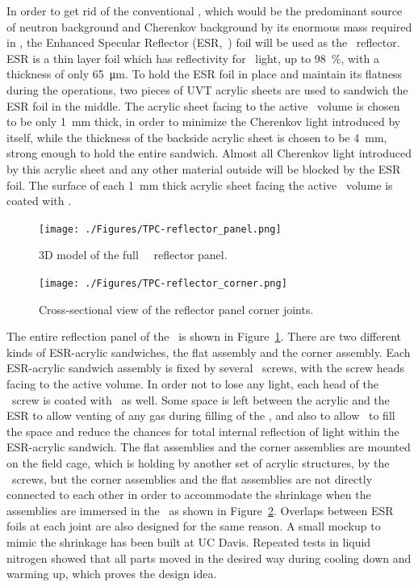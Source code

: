 In order to get rid of the conventional \PTFE, which would be the predominant source of neutron background and Cherenkov background by its enormous mass required in \DSk, the Enhanced Specular Reflector (ESR,~\cite{ESR}) foil will be used as the \TPC\ reflector. ESR is a thin layer foil which has reflectivity for \DSfPMTWaveLength\ light, up to \SI{98}{\percent}, with a thickness of only \SI{65}{\micro\meter}.  To hold the ESR foil in place and maintain its flatness during the operations, two pieces of UVT acrylic sheets are used to sandwich the ESR foil in the middle. The acrylic sheet facing to the active \LAr\ volume is chosen to be only \SI{1}{\mm} thick, in order to minimize the Cherenkov light introduced by itself, while the thickness of the backside acrylic sheet is chosen to be \SI{4}{\mm}, strong enough to hold the entire sandwich. Almost all Cherenkov light introduced by this acrylic sheet and any other material outside will be blocked by the ESR foil. The surface of each \SI{1}{\mm} thick acrylic sheet facing the active \LAr\ volume is coated with \TPB.

\begin{figure}[h!]
\centering
\texttt{[image: ./Figures/TPC-reflector\_panel.png]}
\caption{3D model of the full \DSk\ \LArTPC\ reflector panel.}
\label{fig:re_panel}
\end{figure}

\begin{figure}[h!]
\centering
\texttt{[image: ./Figures/TPC-reflector\_corner.png]}
\caption{Cross-sectional view of the reflector panel corner joints.}
\label{fig:re_corner}
\end{figure}

The entire reflection panel of the \TPC\ is shown in Figure~\ref{fig:re_panel}. There are two different kinds of ESR-acrylic sandwiches, the flat assembly and the corner assembly. Each ESR-acrylic sandwich assembly is fixed by several \PTFE\ screws, with the screw heads facing to the active volume. In order not to lose any light, each head of the \PTFE\ screw is coated with \TPB\ as well. Some space is left between the acrylic and the ESR to allow venting of any gas during filling of the \LAr, and also to allow \LAr\ to fill the space and reduce the chances for total internal reflection of light within the ESR-acrylic sandwich.
The flat assemblies and the corner assemblies are mounted on the field cage, which is holding by another set of acrylic structures, by the \PTFE\ screws, but the corner assemblies and the flat assemblies are not directly connected to each other in order to accommodate the shrinkage when the assemblies are immersed in the \LAr\, as shown in Figure~\ref{fig:re_corner}. Overlaps between ESR foils at each joint are also designed for the same reason. A small mockup to mimic the shrinkage has been built at UC Davis. Repeated tests in liquid nitrogen showed that all parts moved in the desired way during cooling down and warming up, which proves the design idea.

